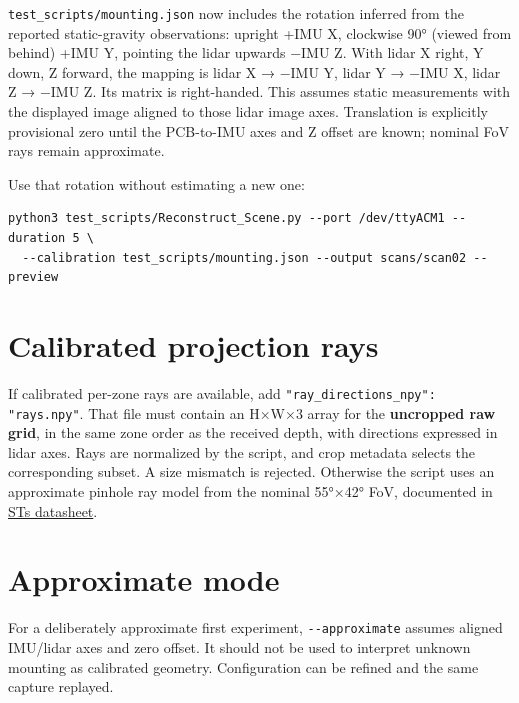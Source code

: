 \documentclass[10pt,a4paper,oneside]{report}
\begin{document}
\texttt{test\_\allowbreak{}scripts/\allowbreak{}mounting.\allowbreak{}json} now includes the rotation inferred from the reported static-gravity observations: upright +IMU X, clockwise 90° (viewed from behind) +IMU Y, pointing the lidar upwards −IMU Z. With lidar X right, Y down, Z forward, the mapping is lidar X → −IMU Y, lidar Y → −IMU X, lidar Z → −IMU Z. Its matrix is right-handed. This assumes static measurements with the displayed image aligned to those lidar image axes. Translation is explicitly provisional zero until the PCB-to-IMU axes and Z offset are known; nominal FoV rays remain approximate.

Use that rotation without estimating a new one:

\begin{verbatim}
python3 test_scripts/Reconstruct_Scene.py --port /dev/ttyACM1 --duration 5 \
  --calibration test_scripts/mounting.json --output scans/scan02 --preview
\end{verbatim}

\section{Calibrated projection rays}\label{wiki-tools-scene-reconstruction--calibrated-projection-rays}

If calibrated per-zone rays are available, add \texttt{"ray\_\allowbreak{}directions\_\allowbreak{}npy":\allowbreak{} "rays.\allowbreak{}npy"}. That file must contain an H×W×3 array for the \textbf{uncropped raw grid}, in the same zone order as the received depth, with directions expressed in lidar axes. Rays are normalized by the script, and crop metadata selects the corresponding subset. A size mismatch is rejected. Otherwise the script uses an approximate pinhole ray model from the nominal 55°×42° FoV, documented in \href{https://www.st.com/resource/en/datasheet/vl53l9cx.pdf}{ST\textquotesingle s datasheet}.

\section{Approximate mode}\label{wiki-tools-scene-reconstruction--approximate-mode}

For a deliberately approximate first experiment, \texttt{-\allowbreak{}-\allowbreak{}approximate} assumes aligned IMU/lidar axes and zero offset. It should not be used to interpret unknown mounting as calibrated geometry. Configuration can be refined and the same capture replayed.
\end{document}
